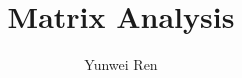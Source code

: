 

\title{Matrix Analysis}
\author{Yunwei Ren}
\date{}


\maketitle
\tableofcontents

\newpage

\newpage

\setcounter{section}{4}
\newpage



